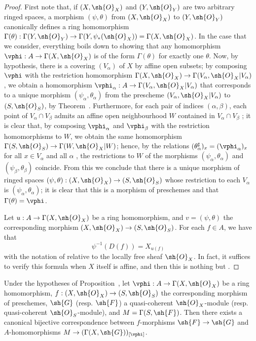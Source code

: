 \begin{proof}
First note that, if $(X,\sh{O}_X)$ and $(Y,\sh{O}_Y)$ are two arbitrary ringed spaces,
a morphism $(\psi,\theta)$ from $(X,\sh{O}_X)$ to $(Y,\sh{O}_Y)$ canonically defines a ring homomorphism $\Gamma(\theta):\Gamma(Y,\sh{O}_Y)\to\Gamma(Y,\psi_*(\sh{O}_X))=\Gamma(X,\sh{O}_X)$.
In the case that we consider, everything boils down to showing that any homomorphism $\vphi:A\to\Gamma(X,\sh{O}_X)$ is of the form $\Gamma(\theta)$ for exactly one $\theta$.
Now, by hypothesis, there is a covering $(V_\alpha)$ of $X$ by affine open subsets;
by composing $\vphi$ with the restriction homomorphism $\Gamma(X,\sh{O}_X)\to\Gamma(V_\alpha,\sh{O}_X|V_\alpha)$, we obtain a homomorphism $\vphi_\alpha:A\to\Gamma(V_\alpha,\sh{O}_X|V_\alpha)$ that corresponds to a unique morphism $(\psi_\alpha,\theta_\alpha)$ from the prescheme $(V_\alpha,\sh{O}_X|V_\alpha)$ to $(S,\sh{O}_S)$, by Theorem~.
Furthermore, for each pair of indices $(\alpha,\beta)$, each point of $V_\alpha\cap V_\beta$ admits an affine open neighbourhood $W$ contained in $V_\alpha\cap V_\beta$ ;
it is clear that, by composing $\vphi_\alpha$ and $\vphi_\beta$ with the restriction homomorphisms to $W$, we obtain the same homomorphism $\Gamma(S,\sh{O}_S)\to\Gamma(W,\sh{O}_X|W)$; hence, by the relations $(\theta_\alpha^\sharp)_x=(\vphi_\alpha)_x$ for all $x\in V_\alpha$ and all $\alpha$ , the restrictions to $W$ of the morphisms $(\psi_\alpha,\theta_\alpha)$ and $(\psi_\beta,\theta_\beta)$ coincide.
From this we conclude that there is a unique morphism of ringed spaces $(\psi,\theta):(X,\sh{O}_X)\to(S,\sh{O}_S)$ whose restriction to each $V_\alpha$ is $(\psi_\alpha,\theta_\alpha)$; it is clear that this is a morphism of preschemes and that $\Gamma(\theta)=\vphi$.

Let $u:A\to\Gamma(X,\sh{O}_X)$ be a ring homomorphism, and $v=(\psi,\theta)$ the corresponding morphism $(X,\sh{O}_X)\to(S,\sh{O}_S)$.
For each $f\in A$, we have that
\[
  \label{I.2.2.4.1}
  \psi^{-1}(D(f))=X_{u(f)}
  \tag{2.2.4.1}
\]
with the notation of  relative to the locally free sheaf $\sh{O}_X$.
In fact, it suffices to verify this formula when $X$ itself is affine, and then this is nothing but .
\end{proof}

\begin{proposition}[2.2.5]
\label{I.2.2.5}
Under the hypotheses of Proposition~, let $\vphi:A\to\Gamma(X,\sh{O}_X)$ be a ring homomorphism, $f:(X,\sh{O}_X)\to(S,\sh{O}_S)$ the corresponding morphism of preschemes, $\sh{G}$ (resp. $\sh{F}$) a quasi-coherent $\sh{O}_X$-module (resp. quasi-coherent $\sh{O}_S$-module), and $M=\Gamma(S,\sh{F})$.
Then there exists a canonical bijective
correspondence between $f$-morphisms $\sh{F}\to\sh{G}$  and $A$-homomorphisms $M\to(\Gamma(X,\sh{G}))_{[\vphi]}$.
\end{proposition}

